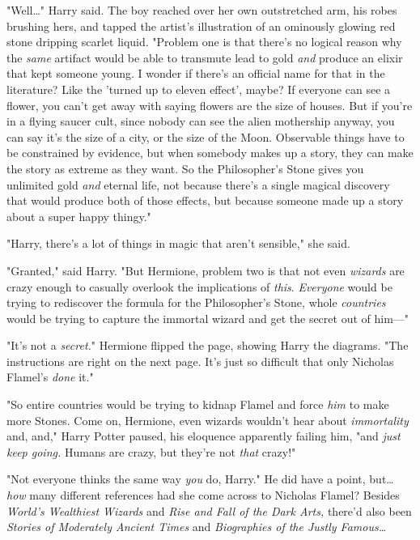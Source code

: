 "Well{\ldots}" Harry said. The boy reached over her own outstretched arm, his 
robes brushing hers, and tapped the artist's illustration of an ominously 
glowing red stone dripping scarlet liquid. "Problem one is that there's no 
logical reason why the \emph{same} artifact would be able to transmute lead to 
gold \emph{and} produce an elixir that kept someone young. I wonder if there's 
an official name for that in the literature? Like the 'turned up to eleven 
effect', maybe? If everyone can see a flower, you can't get away with saying 
flowers are the size of houses. But if you're in a flying saucer cult, since 
nobody can see the alien mothership anyway, you can say it's the size of a 
city, or the size of the Moon. Observable things have to be constrained by 
evidence, but when somebody makes up a story, they can make the story as 
extreme as they want. So the Philosopher's Stone gives you unlimited gold 
\emph{and} eternal life, not because there's a single magical discovery that 
would produce both of those effects, but because someone made up a story about 
a super happy thingy."

"Harry, there's a lot of things in magic that aren't sensible," she said.

"Granted," said Harry. "But Hermione, problem two is that not even 
\emph{wizards} are crazy enough to casually overlook the implications of 
\emph{this}. \emph{Everyone} would be trying to rediscover the formula for the 
Philosopher's Stone, whole \emph{countries} would be trying to capture the 
immortal wizard and get the secret out of him---"

"It's not a \emph{secret.}" Hermione flipped the page, showing Harry the 
diagrams. "The instructions are right on the next page. It's just so difficult 
that only Nicholas Flamel's \emph{done} it."

"So entire countries would be trying to kidnap Flamel and force \emph{him} to 
make more Stones. Come on, Hermione, even wizards wouldn't hear about 
\emph{immortality} and, and," Harry Potter paused, his eloquence apparently 
failing him, "and \emph{just keep going.} Humans are crazy, but they're not 
\emph{that} crazy!"

"Not everyone thinks the same way \emph{you} do, Harry." He did have a point, 
but{\ldots} \emph{how} many different references had she come across to 
Nicholas Flamel? Besides \emph{World's Wealthiest Wizards} and \emph{Rise and 
Fall of the Dark Arts,} there'd also been \emph{Stories of Moderately Ancient 
Times} and \emph{Biographies of the Justly Famous{\ldots}}

